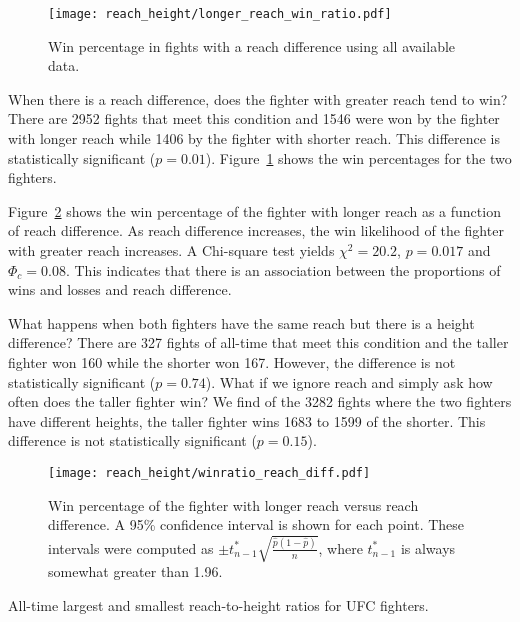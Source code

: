 \clearpage

\begin{figure}[h]
\begin{center}
\texttt{[image: reach\_height/longer\_reach\_win\_ratio.pdf]}
\caption{Win percentage in fights with a reach difference using
all available data.}
\label{winratio_reach_diff_simple}
\end{center}
\end{figure}

When there is a reach difference, does the fighter
with greater reach tend to win?
There are 2952 fights that meet this condition and
1546 were won by the fighter with longer reach while
1406 by the fighter with shorter reach. This difference
is statistically significant ($p=0.01$).
Figure~\ref{winratio_reach_diff_simple}
shows the win percentages for the two fighters.

Figure~\ref{winratio_reach_diff}
shows the win percentage of the fighter with
longer reach as a function of reach difference.
As reach difference increases, the win likelihood of the fighter with greater reach
increases.
A Chi-square test yields $\chi^2=20.2$, $p=0.017$ and $\Phi_c=0.08$.
This indicates that there is an association between the proportions of wins and losses  
and reach difference.

What happens when both fighters have the same reach but there is
a height difference? There are 327 fights of all-time that meet this condition
and the taller fighter won 160 while the shorter won 167. However, the
difference is not statistically significant ($p=0.74$). What if we ignore reach
and simply ask how often does the taller fighter win? We find of the 3282 fights
where the two fighters have different heights, the taller fighter wins 1683 to
1599 of the shorter. This difference is not statistically significant ($p=0.15$).

\begin{figure}[h]
\begin{center}
\texttt{[image: reach\_height/winratio\_reach\_diff.pdf]}
\caption{Win percentage of the fighter with longer reach versus reach difference. A 95\%
confidence interval is shown for each point. These intervals were computed
as $\pm t_{n-1}^{*}\sqrt{\frac{\hat{p}(1-\hat{p})}{n}}$, where $t_{n-1}^{*}$ is always somewhat greater than
1.96.}
\label{winratio_reach_diff}
\end{center}
\end{figure}

\begin{center}
\begin{table}[h]

\caption{All-time largest and smallest reach-to-height ratios for UFC fighters.}
\label{reach2height_large}
\end{table}
\end{center}

